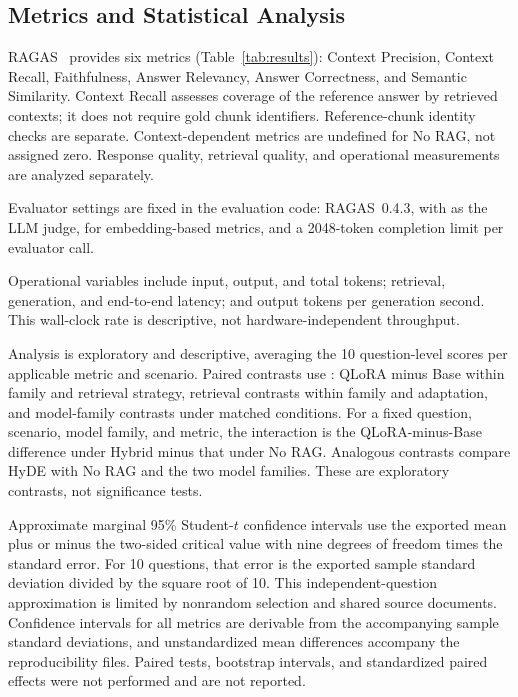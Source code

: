 \subsection{Metrics and Statistical Analysis}
RAGAS~\cite{es2024ragas} provides six metrics (Table~\ref{tab:results}): Context Precision,
Context Recall, Faithfulness, Answer Relevancy, Answer Correctness, and
Semantic Similarity. Context Recall assesses coverage of the reference
answer by retrieved contexts; it does not require gold chunk identifiers.
Reference-chunk identity checks are separate. Context-dependent metrics are
undefined for No RAG, not assigned zero. Response quality, retrieval quality,
and operational measurements are analyzed separately.

Evaluator settings are fixed in the evaluation code: RAGAS~0.4.3, with
 as the LLM judge,  for
embedding-based metrics, and a 2048-token completion limit per evaluator call.

Operational variables include input, output, and total tokens; retrieval,
generation, and end-to-end latency; and output tokens per generation second.
This wall-clock rate is descriptive, not hardware-independent throughput.

Analysis is exploratory and descriptive, averaging the 10 question-level
scores per applicable metric and scenario. Paired contrasts use :
QLoRA minus Base within family and retrieval strategy, retrieval contrasts
within family and adaptation, and model-family contrasts under matched conditions.
For a fixed question, scenario, model family, and metric, the interaction
is the QLoRA-minus-Base difference under Hybrid minus that under No RAG.
Analogous contrasts compare HyDE with No RAG and the two model families.
These are exploratory contrasts, not significance tests.

Approximate marginal 95\% Student-$t$ confidence intervals use the exported
mean plus or minus the two-sided critical value with nine degrees of
freedom times the standard error. For 10 questions, that error is the
exported sample standard deviation divided by the square root of 10.
This independent-question approximation is limited by
nonrandom selection and shared source documents.
Confidence intervals for all metrics are derivable from the accompanying
sample standard deviations, and unstandardized mean differences accompany the
reproducibility files. Paired tests, bootstrap intervals, and standardized
paired effects were not performed and are not reported.

